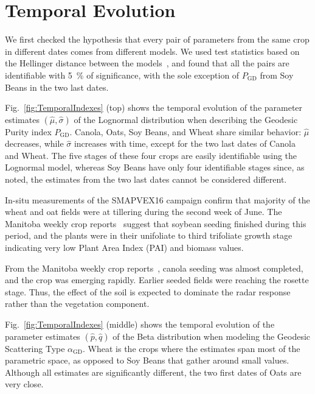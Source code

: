 \documentclass[journal]{IEEEtran}
\begin{document}
{\section{Temporal Evolution}\label{Sec:TemporalEvolution}

We first checked the hypothesis that every pair of parameters from the same crop in different dates comes from different models.
We used test statistics based on the Hellinger distance between the models~\cite{AnalyticExpressionsStochasticDistancesBetweenRelaxedComplexWishartDistributions}, and found that all the pairs are identifiable with \SI{5}{\percent} of significance, with the sole exception of $P_{\text{GD}}$ from Soy Beans in the two last dates.

Fig.~\ref{fig:TemporalIndexes} (top) shows the temporal evolution of the parameter estimates $(\widehat\mu,\widehat\sigma)$ of the Lognormal distribution when describing the Geodesic Purity index $P_{\text{GD}}$.
Canola, Oats, Soy Beans, and Wheat share similar behavior: $\widehat\mu$ decreases, while $\widehat\sigma$ increases with time, except for the two last dates of Canola and Wheat.
The five stages of these four crops are easily identifiable using the Lognormal model, whereas Soy Beans have only four identifiable stages since, as noted, the estimates from the two last dates cannot be considered different.

In-situ measurements of the SMAPVEX16 campaign confirm that majority of the wheat and oat fields were at tillering during the second week of June. The Manitoba weekly crop reports~\cite{manitobaagriculture} suggest that soybean seeding finished during this period, and the plants were in their unifoliate to third trifoliate growth stage indicating very low Plant Area Index (PAI) and biomass values.

From the Manitoba weekly crop reports~\cite{manitobaagriculture}, canola seeding was almost completed, and the crop was emerging rapidly. 
Earlier seeded fields were reaching the rosette stage. 
Thus, the effect of the soil is expected to dominate the radar response rather than the vegetation component.

Fig.~\ref{fig:TemporalIndexes} (middle) shows the temporal evolution of the parameter estimates $(\widehat p, \widehat q)$ of the Beta distribution when modeling the Geodesic Scattering Type $\alpha_{\text{GD}}$.
Wheat is the crops where the estimates span most of the parametric space, as opposed to Soy Beans that gather around small values.
Although all estimates are significantly different, the two first dates of Oats are very close.

}
\end{document}
